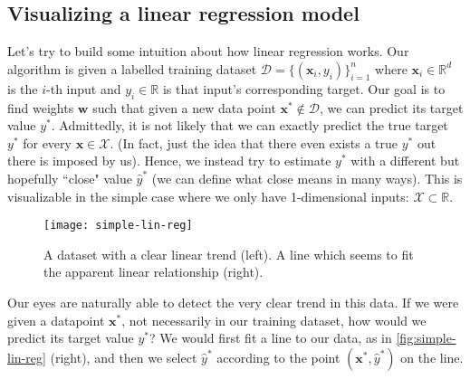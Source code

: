 
\subsection{Visualizing a linear regression model}
Let's try to build some intuition about how linear regression works. Our algorithm is given a labelled training dataset $\mathcal D = \{(\bm x_i, y_i)\}_{i=1}^{n}$ where $\bm x_i \in \mathbb R^d$ is the $i$-th input and $y_i \in \mathbb R$ is that input's corresponding target. Our goal is to find weights $\bm w$ such that given a new data point $\bm x^* \not \in \mathcal D$, we can predict its target value $y^*$. Admittedly, it is not likely that we can exactly predict the true target $y^*$ for every $\bm x \in \mathcal X$. (In fact, just the idea that there even exists a true $y^*$ out there is imposed by us). Hence, we instead try to estimate $y^*$ with a different but hopefully ``close" value $\hat y^*$ (we can define what close means in many ways). This is visualizable in the simple case where we only have 1-dimensional inputs: $\mathcal{X} \subset \mathbb{R}$.

\begin{figure}
    \centering
    \texttt{[image: simple-lin-reg]}
    \caption{A dataset with a clear linear trend (left). A line which seems to fit the apparent linear relationship (right).}
    \label{fig:simple-lin-reg}
\end{figure}

Our eyes are naturally able to detect the very clear trend in this data. If we were given a datapoint $\bm x^*$, not necessarily in our training dataset, how would we predict its target value $y^*$? We would first fit a line to our data, as in \autoref{fig:simple-lin-reg} (right), and then we select $\hat y^*$ according to the point $(\bm x^*, \hat y^*)$ on the line.

